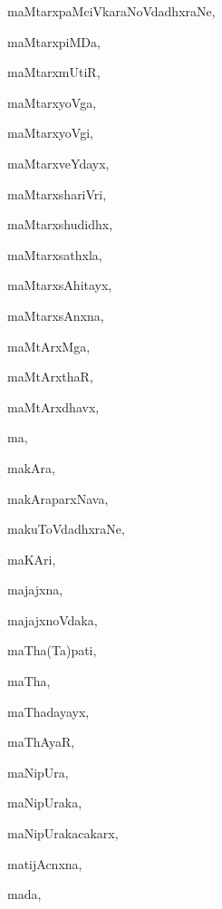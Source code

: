 \begin{multicols}{3}
{\noindent
{maMtarxpaMciVkaraNoVdadhxraNe}, \pageref{maMtarxpaMciVkaraNoVdadhxraNe}

\noindent
{maMtarxpiMDa}, \pageref{maMtarxpiMDa}

\noindent
{maMtarxmUtiR}, \pageref{maMtarxmUtiR}

\noindent
{maMtarxyoVga}, \pageref{maMtarxyoVga}

\noindent
{maMtarxyoVgi}, \pageref{maMtarxyoVgi}

\noindent
{maMtarxveYdayx}, \pageref{maMtarxveYdayx}

\noindent
{maMtarxshariVri}, \pageref{maMtarxshariVri}

\noindent
{maMtarxshudidhx}, \pageref{maMtarxshudidhx}

\noindent
{maMtarxsathxla}, \pageref{maMtarxsathxla}

\noindent
{maMtarxsAhitayx}, \pageref{maMtarxsAhitayx}

\noindent
{maMtarxsAnxna}, \pageref{maMtarxsAnxna}

\noindent
{maMtArxMga}, \pageref{maMtArxMga}

\noindent
{maMtArxthaR}, \pageref{maMtArxthaR}

\noindent
{maMtArxdhavx}, \pageref{maMtArxdhavx}

\noindent
{ma}, \pageref{ma}

\noindent
{makAra}, \pageref{makAra}

\noindent
{makAraparxNava}, \pageref{makAraparxNava}

\noindent
{makuToVdadhxraNe}, \pageref{makuToVdadhxraNe}

\noindent
{maKAri}, \pageref{maKAri}

\noindent
{majajxna}, \pageref{majajxna}

\noindent
{majajxnoVdaka}, \pageref{majajxnoVdaka}

\noindent
{maTha(Ta)pati}, \pageref{maThaTapati}

\noindent
{maTha}, \pageref{maTha}

\noindent
{maThadayayx}, \pageref{maThadayayx}

\noindent
{maThAyaR}, \pageref{maThAyaR}

\noindent
{maNipUra}, \pageref{maNipUra}

\noindent
{maNipUraka}, \pageref{maNipUraka}

\noindent
{maNipUrakacakarx}, \pageref{maNipUrakacakarx}

\noindent
{matijAcnxna}, \pageref{matijAcnxna}

\noindent
{mada}, \pageref{mada}

}
\end{multicols}
